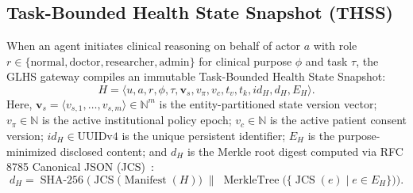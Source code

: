 \documentclass[11pt,a4paper]{article}
\begin{document}
\subsection{Task-Bounded Health State Snapshot (THSS)}
When an agent initiates clinical reasoning on behalf of actor $a$ with role $r \in \{\text{normal}, \text{doctor}, \text{researcher}, \text{admin}\}$ for clinical purpose $\phi$ and task $\tau$, the GLHS gateway compiles an immutable Task-Bounded Health State Snapshot:
\begin{equation}
H = \langle u, a, r, \phi, \tau, \mathbf{v}_s, v_{\pi}, v_c, t_v, t_k, id_H, d_H, E_H \rangle.
\label{eq:thss_definition}
\end{equation}
Here, $\mathbf{v}_s = \langle v_{s,1}, \dots, v_{s,m} \rangle \in \mathbb{N}^m$ is the entity-partitioned state version vector; $v_{\pi} \in \mathbb{N}$ is the active institutional policy epoch; $v_c \in \mathbb{N}$ is the active patient consent version; $id_H \in \text{UUIDv4}$ is the unique persistent identifier; $E_H$ is the purpose-minimized disclosed content; and $d_H$ is the Merkle root digest computed via RFC 8785 Canonical JSON (JCS)~\cite{rfc8785}:
\begin{equation}
d_H = \operatorname{SHA-256}\Big(\operatorname{JCS}\big(\operatorname{Manifest}(H)\big) \;\parallel\; \operatorname{MerkleTree}\big(\{ \operatorname{JCS}(e) \mid e \in E_H \}\big)\Big).
\label{eq:digest_merkle}
\end{equation}
\end{document}
